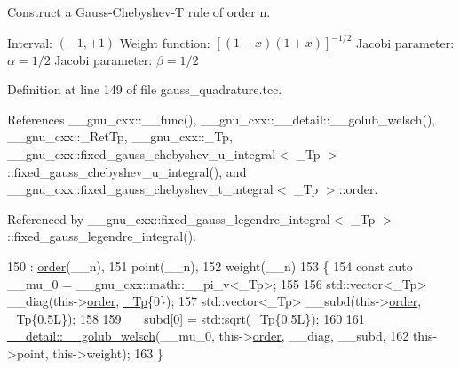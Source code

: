 Construct a Gauss-\/\+Chebyshev-\/T rule of order {\ttfamily n}.

Interval\+: $ (-1, +1) $ Weight function\+: $ [(1-x)(1+x)]^{-1/2} $ Jacobi parameter\+: $ \alpha = 1/2 $ Jacobi parameter\+: $ \beta = 1/2 $ 

Definition at line 149 of file gauss\+\_\+quadrature.\+tcc.



References \+\_\+\+\_\+gnu\+\_\+cxx\+::\+\_\+\+\_\+func(), \+\_\+\+\_\+gnu\+\_\+cxx\+::\+\_\+\+\_\+detail\+::\+\_\+\+\_\+golub\+\_\+welsch(), \+\_\+\+\_\+gnu\+\_\+cxx\+::\+\_\+\+Ret\+Tp, \+\_\+\+\_\+gnu\+\_\+cxx\+::\+\_\+\+Tp, \+\_\+\+\_\+gnu\+\_\+cxx\+::fixed\+\_\+gauss\+\_\+chebyshev\+\_\+u\+\_\+integral$<$ \+\_\+\+Tp $>$\+::fixed\+\_\+gauss\+\_\+chebyshev\+\_\+u\+\_\+integral(), and \+\_\+\+\_\+gnu\+\_\+cxx\+::fixed\+\_\+gauss\+\_\+chebyshev\+\_\+t\+\_\+integral$<$ \+\_\+\+Tp $>$\+::order.



Referenced by \+\_\+\+\_\+gnu\+\_\+cxx\+::fixed\+\_\+gauss\+\_\+legendre\+\_\+integral$<$ \+\_\+\+Tp $>$\+::fixed\+\_\+gauss\+\_\+legendre\+\_\+integral().


\begin{DoxyCode}
150     : \hyperlink{struct____gnu__cxx_1_1fixed__gauss__chebyshev__t__integral_a591563313b6205bd714cf1343cc48192}{order}(\_\_n),
151       point(\_\_n),
152       weight(\_\_n)
153     \{
154       \textcolor{keyword}{const} \textcolor{keyword}{auto} \_\_mu\_0 = \_\_gnu\_cxx::math::\_\_pi\_v<\_Tp>;
155 
156       std::vector<\_Tp> \_\_diag(this->\hyperlink{struct____gnu__cxx_1_1fixed__gauss__chebyshev__t__integral_a591563313b6205bd714cf1343cc48192}{order}, \hyperlink{namespace____gnu__cxx_a3b19a9c800ca194374ef9172290f7d79}{\_Tp}\{0\});
157       std::vector<\_Tp> \_\_subd(this->\hyperlink{struct____gnu__cxx_1_1fixed__gauss__chebyshev__t__integral_a591563313b6205bd714cf1343cc48192}{order}, \hyperlink{namespace____gnu__cxx_a3b19a9c800ca194374ef9172290f7d79}{\_Tp}\{0.5L\});
158 
159       \_\_subd[0] = std::sqrt(\hyperlink{namespace____gnu__cxx_a3b19a9c800ca194374ef9172290f7d79}{\_Tp}\{0.5L\});
160 
161       \hyperlink{namespace____gnu__cxx_1_1____detail_aa9f299bb7c04606a9a9aab3ab9e4f4c8}{\_\_detail::\_\_golub\_welsch}(\_\_mu\_0, this->\hyperlink{struct____gnu__cxx_1_1fixed__gauss__chebyshev__t__integral_a591563313b6205bd714cf1343cc48192}{order}, \_\_diag, \_\_subd,
162                                this->point, this->weight);
163     \}
\end{DoxyCode}


